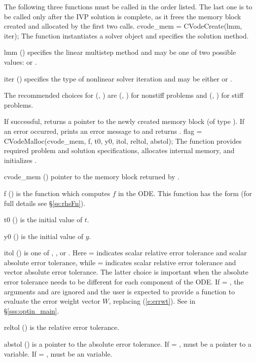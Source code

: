 The following three functions must be called in the order listed. The last one
is to be called only after the IVP solution is complete, as it frees the
{\cvodes} memory block created and allocated by the first two calls.
{
  cvode\_mem = CVodeCreate(lmm, iter);
}
{
  The function  instantiates a {\cvodes} solver object and
  specifies the solution method.
}
{
  \begin{args}[iter]
  \item[lmm] ()
    specifies the linear multistep method and may be one of two
    possible values:  or .     
  \item[iter] ()
    specifies the type of nonlinear solver iteration and may be
    either  or . 
  \end{args}
  The recommended choices for (, ) are
  (, ) for nonstiff problems and
  (, ) for stiff problems.
}
{
  If successful,  returns a pointer to the newly created 
  {\cvodes} memory block (of type ).
  If an error occurred,  prints an error message to 
  and returns .
}
{}
{
flag = CVodeMalloc(cvode\_mem, f, t0, y0, itol, reltol, abstol);
}
{
  The function  provides required problem and solution
  specifications, allocates internal memory, and initializes {\cvodes}.
}
{
  \begin{args}
  \item[cvode\_mem] ()
    pointer to the {\cvodes} memory block returned by .
  \item[f] ()
    is the {\C} function which computes $f$ in the ODE. This function has the 
    form  (for full details see \S\ref{ss:rhsFn}).
  \item[t0] ()
    is the initial value of $t$.
  \item[y0] ()
    is the initial value of $y$. 
  \item[itol] () 
    is one of , , or . Here  = 
    indicates scalar relative error tolerance and scalar absolute error tolerance,
    while  =  indicates scalar relative error tolerance and
    vector absolute error tolerance.  The latter choice is important when the
    absolute error tolerance needs to be different for each component of the ODE. 
    If  = , the arguments  and  are
    ignored and the user is expected to provide a function to evaluate the error
    weight vector $W$, replacing (\ref{e:errwt}). See  in
    \S\ref{sss:optin_main}.
  \item[reltol] ()
    is the relative error tolerance.
  \item[abstol] ()
    is a pointer to the absolute error tolerance. If  = ,
     must be a pointer to a  variable. If
     = ,  must be an  variable.
  \end{args}
}
